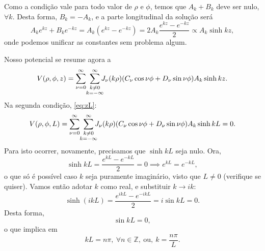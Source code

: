 \documentclass{article}
\begin{document}
Como a condição vale para todo valor de $\rho$ e $\phi$, temos que $A_k + B_k$ deve ser nulo, $\forall k$. Desta forma, $B_k = -A_k$, e a parte longitudinal da solução
será
\begin{equation}
 A_k e^{kz} + B_k e^{-kz} = A_k (e^{kz} - e^{-kz}) = 2A_k \frac{e^{kz} - e^{-kz}}{2} \propto A_k \sinh{kz}\mathrm{,}
\end{equation}
onde podemos unificar as constantes sem problema algum.

Nosso potencial se resume agora a
\begin{equation}
 V(\rho,\phi,z) = \sum_{\nu = 0}^{\infty} \ \sum_{\mathclap{\substack{k \neq 0 \\ k = -\infty}}}^{\infty} J_{\nu}(k\rho)
 (C_{\nu}\cos{\nu \phi} + D_{\nu}\sin{\nu \phi})A_k \sinh{kz} \mathrm{.}
\end{equation}
Na segunda condição, \eqref{eq:zL}:
\begin{equation}
 V(\rho,\phi,L) = \sum_{\nu = 0}^{\infty} \ \sum_{\mathclap{\substack{k \neq 0 \\ k = -\infty}}}^{\infty} J_{\nu}(k\rho)
 (C_{\nu}\cos{\nu \phi} + D_{\nu}\sin{\nu \phi})A_k \sinh{kL} = 0\mathrm{.}
\end{equation}
Para isto ocorrer, novamente, precisamos que $\sinh{kL}$ seja nulo. Ora,
\begin{equation}
 \sinh{kL} = \frac{e^{kL} - e^{-kL}}{2} = 0 \implies e^{kL} = e^{-kL}\mathrm{,}
\end{equation}
o que só é possível caso $k$ seja puramente imaginário, visto que $L \neq 0$ (verifique se quiser). Vamos então adotar $k$ como real, e substituir $k \to i k$:
\begin{equation}
 \sinh{(ikL)} = \frac{e^{ikL} - e^{-ikL}}{2} = i \sin{kL} = 0\mathrm{.}
\end{equation}
Desta forma,
\begin{equation}
 \sin{kL} = 0 \mathrm{,}
\end{equation}
o que implica em
\begin{equation}\label{eq:ken}
 kL = n \pi,\ \forall n \in \mathbb{Z},\ \mathrm{ou,\ }k = \frac{n \pi}{L}\mathrm{.}
\end{equation}
\end{document}
